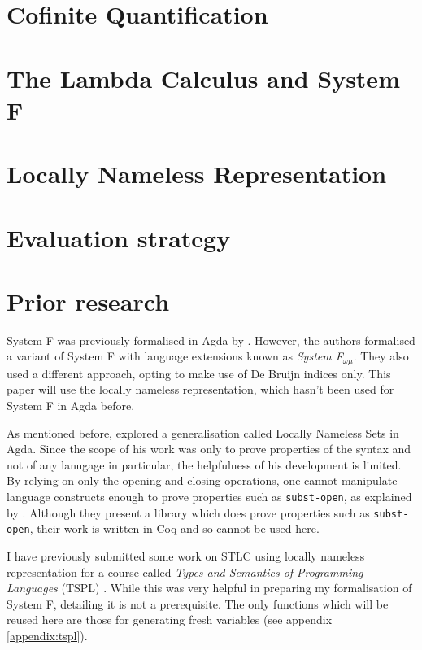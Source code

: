 \documentclass[logo,bsc,singlespacing,parskip,online]{infthesis}
\begin{document}
\section{Cofinite Quantification}



\section{The Lambda Calculus and System F}


\section{Locally Nameless Representation}


\section{Evaluation strategy}
\label{background:evaluation_strategy}


\section{Prior research}
System F was previously formalised in Agda by \citet{hutton_system_2019}. However, the authors
formalised a variant of System F with language extensions known as \textit{System F$_{\omega \mu}$}.
They also used a different approach, opting to make use of De Bruijn indices only. This paper will
use the locally nameless representation, which hasn't been used for System F in Agda before.

As mentioned before, \citet{pitts_locally_2023} explored a generalisation called Locally Nameless
Sets in Agda. Since the scope of his work was only to prove properties of the syntax and not of any
lanugage in particular, the helpfulness of his development is limited. By relying on only the
opening and closing operations, one cannot manipulate language constructs enough to prove properties
such as \texttt{subst-open}, as explained by \citet{kiselyov_generic_2025}. Although they present a
library which does prove properties such as \texttt{subst-open}, their work is written in Coq and so
cannot be used here.

I have previously submitted some work on STLC using locally nameless representation for a course
called \textit{Types and Semantics of Programming Languages} (TSPL) \citep{ausel_simply_2025}. While
this was very helpful in preparing my formalisation of System F, detailing it is not a prerequisite.
The only functions which will be reused here are those for generating fresh variables (see appendix
\ref{appendix:tspl}).
\end{document}
